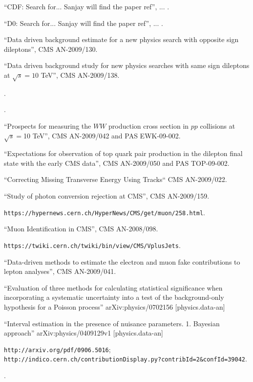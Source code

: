 \begin{thebibliography}{99}

 {``CDF: Search for... Sanjay will find the paper ref''}, ... .

 {``D0: Search for... Sanjay will find the paper ref''}, ... .

 {``Data driven background estimate for a new physics search with opposite sign dileptons''}, CMS AN-2009/130.

 {``Data driven background study for new physics searches with same sign dileptons at $\sqrt{s} = 10 $ TeV''}, CMS AN-2009/138.

.

.

 {``Prospects for measuring the $WW$ production cross section in $pp$ collisions at $\sqrt s = $10 TeV''}, CMS AN-2009/042 and PAS EWK-09-002.

 {``Expectations for observation of top quark pair production in the dilepton final state with the early CMS data''}, CMS AN-2009/050 and PAS TOP-09-002.

 {``Correcting Missing Transverse Energy Using Tracks``} CMS AN-2009/022.

 {``Study of photon conversion rejection at CMS''}, CMS AN-2009/159.

 {\tt https://hypernews.cern.ch/HyperNews/CMS/get/muon/258.html}.

 {``Muon Identification in CMS''}, CMS AN-2008/098.

 {\tt https://twiki.cern.ch/twiki/bin/view/CMS/VplusJets}.

 {``Data-driven methods to estimate the electron and muon fake contributions to lepton analyses''}, CMS AN-2009/041.

 {``Evaluation of three methods for calculating statistical significance when incorporating a systematic uncertainty into a test of the background-only hypothesis for a Poisson process''} arXiv:physics/0702156 [physics.data-an]

 {``Interval estimation in the presence of nuisance parameters. 1. Bayesian approach''} arXiv:physics/0409129v1 [physics.data-an]

 {\tt http://arxiv.org/pdf/0906.5016}; \\
{\tt http://indico.cern.ch/contributionDisplay.py?contribId=2\&confId=39042}.

.



\end{thebibliography}